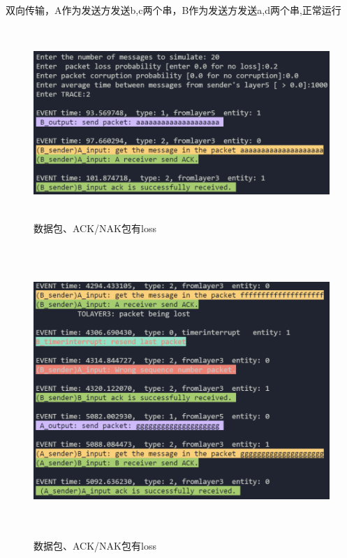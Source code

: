 \documentclass[UTF8,14pt]{article}
\numberwithin{figure}{section}
\begin{document}
双向传输，A作为发送方发送b,c两个串，B作为发送方发送a,d两个串,正常运行
\clearpage
\begin{center}
      \begin{figure}[!ht]
            \centering
            \includegraphics[width=15cm,height=7.24cm]{result3_1.png}
            \caption{数据包、ACK/NAK包有loss}
      \end{figure}
      \begin{figure}[!ht]
            \centering
            \includegraphics[width=15cm,height=11cm]{result3_2.png}
            \caption{数据包、ACK/NAK包有loss}
      \end{figure}
\end{center}
\vspace{-1.5cm}
\end{document}
